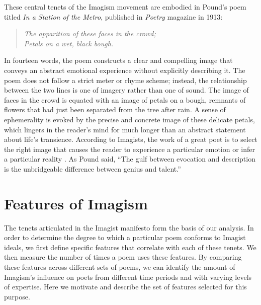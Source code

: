 \documentclass{book}
\begin{document}
These central tenets of the Imagism movement are embodied in Pound's poem titled \emph{In a Station of the Metro}, published in \emph{Poetry} magazine in 1913:

\begin{verse}
\emph{The apparition of these faces in the crowd;\\
Petals on a wet, black bough.}
\end{verse}

In fourteen words, the poem constructs a clear and compelling image that conveys an abstract emotional experience without explicitly describing it. The poem does not follow a strict meter or rhyme scheme; instead, the relationship between the two lines is one of imagery rather than one of sound. The image of faces in the crowd is equated with an image of petals on a bough, remnants of flowers that had just been separated from the tree after rain. A sense of ephemerality is evoked by the precise and concrete image of these delicate petals, which lingers in the reader's mind for much longer than an abstract statement about life's transience. According to Imagists, the work of a great poet is to select the right image that causes the reader to experience a particular emotion or infer a particular reality \citep{hamilton2004toward}. As Pound said, 
``The gulf between evocation and description is the unbridgeable difference between genius and talent.'' 


\section{Features of Imagism}
The tenets articulated in the Imagist manifesto form the basis of our analysis. In order to determine the degree to which a particular poem conforms to Imagist ideals, we first define specific features that correlate with each of these tenets. We then measure the number of times a poem uses these features. By comparing these features across different sets of poems, we can identify the amount of Imagism's influence on poets from different time periods and with varying levels of expertise. Here we motivate and describe the set of features selected for this purpose.
\end{document}
